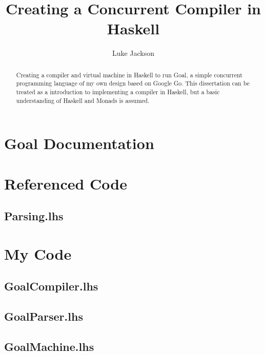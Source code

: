 \documentclass{report}
\author{Luke Jackson}
\title{Creating a Concurrent Compiler in Haskell}
\begin{document}
\maketitle

\begin{abstract}
Creating a compiler and virtual machine in Haskell to run Goal, a simple concurrent programming language of my own design based on Google Go. This dissertation can be treated as a introduction to implementing a compiler in Haskell, but a basic understanding of Haskell and Monads is assumed.
\end{abstract}

\tableofcontents









\newpage

\appendix

\chapter{Goal Documentation}


\chapter{Referenced Code}
\section{Parsing.lhs}


\chapter{My Code}

\section{GoalCompiler.lhs}


\section{GoalParser.lhs}


\section{GoalMachine.lhs}




\end{document}
